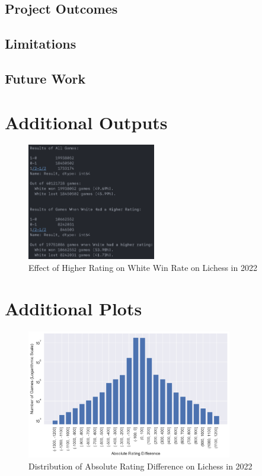 \documentclass[a4paper, 11pt]{article}
\begin{document}
\subsection{Project Outcomes}

\subsection{Limitations}

\subsection{Future Work}




\newpage
\begin{appendices}

\section{Additional Outputs}
\begin{figure}[H]
    \centering
    \caption{Effect of Higher Rating on White Win Rate on Lichess in 2022}
    \label{fig:effectOfHigherRatingOnWhiteWinRate}
    \includegraphics[width=0.5\textwidth]{Effect of Higher Rating on White Win Rate.png}
\end{figure}

\section{Additional Plots}
\begin{figure}[H]
    \centering
    \caption{Distribution of Absolute Rating Difference on Lichess in 2022}
    \label{fig:distributionOfAbsoluteRatingDifference}
    \includegraphics[width=0.8\textwidth]{Distribution of Absolute Rating Difference.png}
\end{figure}


\end{appendices}
\end{document}
